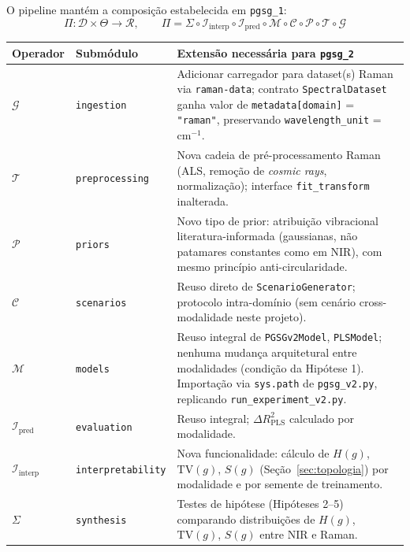 \documentclass[11pt,a4paper]{article}
\begin{document}
O pipeline mantém a composição estabelecida em \texttt{pgsg\_1}:
\[
\Pi : \mathcal{D} \times \Theta \longrightarrow \mathcal{R}, \qquad
\Pi = \Sigma \circ \mathcal{I}_{\text{interp}} \circ \mathcal{I}_{\text{pred}} \circ \mathcal{M} \circ \mathcal{C} \circ \mathcal{P} \circ \mathcal{T} \circ \mathcal{G}
\]

\begin{center}
\begin{longtable}{p{1.3cm}p{2.6cm}p{9.8cm}}
\toprule
Operador & Submódulo & Extensão necessária para \texttt{pgsg\_2} \\
\midrule
\endhead
$\mathcal{G}$ & \texttt{ingestion} & Adicionar carregador para dataset(s) Raman via \texttt{raman-data}; contrato \texttt{SpectralDataset} ganha valor de \texttt{metadata[domain]} = \texttt{"raman"}, preservando \texttt{wavelength\_unit} = cm$^{-1}$. \\
$\mathcal{T}$ & \texttt{preprocessing} & Nova cadeia de pré-processamento Raman (ALS, remoção de \emph{cosmic rays}, normalização); interface \texttt{fit\_transform} inalterada. \\
$\mathcal{P}$ & \texttt{priors} & Novo tipo de prior: atribuição vibracional literatura-informada (gaussianas, não patamares constantes como em NIR), com mesmo princípio anti-circularidade. \\
$\mathcal{C}$ & \texttt{scenarios} & Reuso direto de \texttt{ScenarioGenerator}; protocolo intra-domínio (sem cenário cross-modalidade neste projeto). \\
$\mathcal{M}$ & \texttt{models} & Reuso integral de \texttt{PGSGv2Model}, \texttt{PLSModel}; nenhuma mudança arquitetural entre modalidades (condição da Hipótese 1). Importação via \texttt{sys.path} de \texttt{pgsg\_v2.py}, replicando \texttt{run\_experiment\_v2.py}. \\
$\mathcal{I}_{\text{pred}}$ & \texttt{evaluation} & Reuso integral; $\Delta R^2_{\text{PLS}}$ calculado por modalidade. \\
$\mathcal{I}_{\text{interp}}$ & \texttt{interpretability} & Nova funcionalidade: cálculo de $H(g)$, $\mathrm{TV}(g)$, $S(g)$ (Seção~\ref{sec:topologia}) por modalidade e por semente de treinamento. \\
$\Sigma$ & \texttt{synthesis} & Testes de hipótese (Hipóteses 2--5) comparando distribuições de $H(g)$, $\mathrm{TV}(g)$, $S(g)$ entre NIR e Raman. \\
\bottomrule
\end{longtable}
\end{center}
\end{document}
